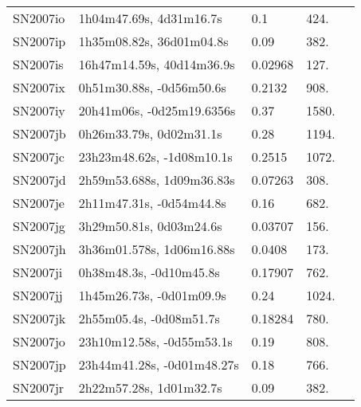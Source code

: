 \begin{longtable}{lllll}
         SN2007io &        1h04m47.69s, 4d31m16.7s &      0.1 &           424. &    \citet{2007CBET.1063A...1:} \\
         SN2007ip &       1h35m08.82s, 36d01m04.8s &     0.09 &           382. &    \citet{2007CBET.1063A...1:} \\
         SN2007is &      16h47m14.59s, 40d14m36.9s &  0.02968 &           127. &    \citet{2003SDSS1.C...0000:} \\
         SN2007ix &       0h51m30.88s, -0d56m50.6s &   0.2132 &           908. &    \citet{2011ApJ...740...92G} \\
         SN2007iy &      20h41m06s, -0d25m19.6356s &     0.37 &          1580. &    \citet{2007CBET.1076A...1:} \\
         SN2007jb &        0h26m33.79s, 0d02m31.1s &     0.28 &          1194. &    \citet{2007CBET.1076A...1:} \\
         SN2007jc &      23h23m48.62s, -1d08m10.1s &   0.2515 &          1072. &    \citet{2011ApJ...741...73V} \\
         SN2007jd &      2h59m53.688s, 1d09m36.83s &  0.07263 &           308. &    \citet{2003SDSS1.C...0000:} \\
         SN2007je &       2h11m47.31s, -0d54m44.8s &     0.16 &           682. &    \citet{2007CBET.1076A...1:} \\
         SN2007jg &        3h29m50.81s, 0d03m24.6s &  0.03707 &           156. &    \citet{2016AJ....152...50T} \\
         SN2007jh &      3h36m01.578s, 1d06m16.88s &   0.0408 &           173. &    \citet{2003SDSS1.C...0000:} \\
         SN2007ji &        0h38m48.3s, -0d10m45.8s &  0.17907 &           762. &    \citet{2016SDSSD.C...0000:} \\
         SN2007jj &       1h45m26.73s, -0d01m09.9s &     0.24 &          1024. &    \citet{2007CBET.1079A...1:} \\
         SN2007jk &        2h55m05.4s, -0d08m51.7s &  0.18284 &           780. &    \citet{2011ApJ...740...92G} \\
         SN2007jo &      23h10m12.58s, -0d55m53.1s &     0.19 &           808. &    \citet{2007CBET.1079A...1:} \\
         SN2007jp &     23h44m41.28s, -0d01m48.27s &     0.18 &           766. &    \citet{2007CBET.1079A...1:} \\
         SN2007jr &        2h22m57.28s, 1d01m32.7s &     0.09 &           382. &    \citet{2007CBET.1079A...1:} \\

\end{longtable}

